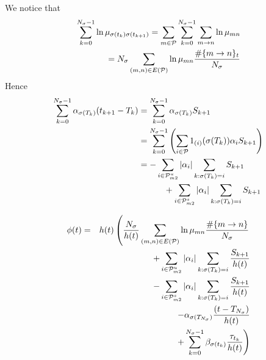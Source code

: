 \documentclass[twocolumn]{autart}    %
\begin{document}
\begin{pf}
    We notice that
    \begin{equation}
        \begin{aligned}
            \setlength{\arraycolsep}{0.9pt}
            \sum_{k = 0}^{N_{\sigma}-1}\ln \mu_{\sigma(t_{k})\sigma(t_{k+1})} = \sum_{m \in \mathcal{P}}\sum_{k = 0}^{N_{\sigma}-1}\sum_{m \rightarrow n}\ln \mu_{mn}\\
            =N_{\sigma}\sum_{(m,n)\in E(\mathcal{P})}\ln \mu_{mn} \frac{\#\{m \rightarrow n\}_{t}}{N_{\sigma}}
        \end{aligned}
    \end{equation}
    Hence
    \begin{equation}
        \begin{aligned}
            \setlength{\arraycolsep}{0.9pt}
            \sum_{k=0}^{N_{\sigma}-1}\alpha_{\sigma(T_{k})}(t_{k+1}-T_{k}) &= \sum_{k=0}^{N_{\sigma}-1}\alpha_{\sigma(T_{k})}S_{k+1} \\
            & = \sum_{k=0}^{N_{\sigma}-1}\left(\sum_{i \in \mathcal{P}}1_{(i)}(\sigma(T_{k}))\alpha_{i}S_{k+1}\right)\\
            & = -\sum_{i \in \mathcal{P}_{m2}^{u}}\left|\alpha_{i}\right|\sum_{k:\sigma(T_{k})=i}S_{k+1} \\
            &  \qquad \quad+ \sum_{i \in \mathcal{P}_{m2}^{s}}\left|\alpha_{i}\right|\sum_{k:\sigma(T_{k})=i}S_{k+1} 
        \end{aligned}
    \end{equation}
    
    
    \begin{equation}
        \begin{aligned}
            \setlength{\arraycolsep}{0.9pt}
            \phi(t) &=& h(t)\left(\frac{N_{\sigma}}{h(t)}\sum_{(m,n) \in E(\mathcal{P})}\ln\mu_{mn}\frac{\# \{m \rightarrow n\}}{N_{\sigma}} \right.\\
            & &+ \sum_{i \in \mathcal{P}_{m2}^{u}}\left|\alpha_{i}\right|\sum_{k:\sigma(T_{k})=i}\frac{S_{k+1}}{h(t)}\\
            & &-\sum_{i \in \mathcal{P}_{m2}^{s}}\left|\alpha_{i}\right|\sum_{k:\sigma(T_{k})=i}\frac{S_{k+1}}{h(t)}\\
            & &-\alpha_{\sigma(T_{N_{\sigma}})} \frac{(t-T_{N_{\sigma}})}{h(t)}\\
            & &\left.+\sum_{k=0}^{N_{\sigma}-1}\beta_{\sigma(t_{k})}\frac{\tau_{t_{k}}}{h(t)}\right)
        \end{aligned}
    \end{equation}
    

\end{pf}
\end{document}
